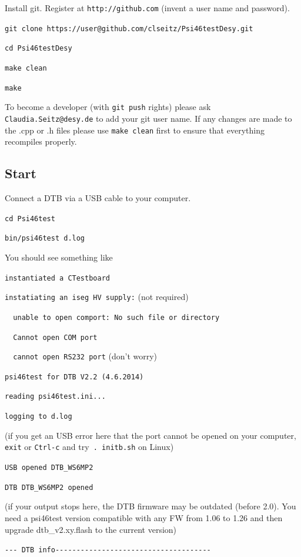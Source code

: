 \documentclass[english]{article}
\begin{document}
Install git. Register at \texttt{http://github.com} (invent a user
name and password).

\noindent \texttt{git clone https://user@github.com/clseitz/Psi46testDesy.git}

\texttt{cd Psi46testDesy}

\noindent \texttt{make clean}

\noindent \texttt{make}

To become a developer (with \texttt{git push} rights) please ask \texttt{Claudia.Seitz@desy.de}
to add your git user name. If any changes are made to the .cpp or
.h files please use \texttt{make clean} first to ensure that everything
recompiles properly.


\subsection{Start}

Connect a DTB via a USB cable to your computer.

\texttt{cd Psi46test}

\noindent \texttt{bin/psi46test d.log}

You should see something like

\texttt{instantiated a CTestboard}

\texttt{instatiating an iseg HV supply:} (not required)

\texttt{~~unable to open comport: No such file or directory}

\texttt{~~Cannot open COM port}

\texttt{~~cannot open RS232 port} (don't worry)

\texttt{psi46test for DTB V2.2 (4.6.2014)}

\texttt{reading psi46test.ini... }

\texttt{logging to d.log}

(if you get an USB error here that the port cannot be opened on your
computer, \texttt{exit} or \texttt{Ctrl-c} and try\texttt{ . initb.sh}
on Linux)

\texttt{USB opened DTB\_WS6MP2}

\texttt{DTB DTB\_WS6MP2 opened}

(if your output stops here, the DTB firmware may be outdated (before
2.0). You need a psi46test version compatible with any FW from 1.06
to 1.26 and then upgrade dtb\_v2.xy.flash to the current version)

\texttt{-{}-{}- DTB info-{}-{}-{}-{}-{}-{}-{}-{}-{}-{}-{}-{}-{}-{}-{}-{}-{}-{}-{}-{}-{}-{}-{}-{}-{}-{}-{}-{}-{}-{}-{}-{}-{}-{}-{}-{}-}
\end{document}
